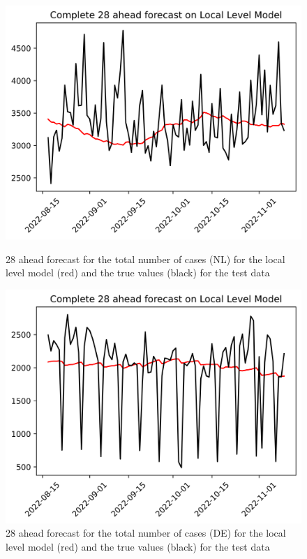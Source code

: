 \begin{figure}

\begin{minipage}{.45\textwidth}
  \centering
  \includegraphics[width=\linewidth]{pics/28_ah/Complete_28_ahead_Local Level Model.png}
  \caption{28 ahead forecast for the total number of cases (NL) for the local level model (red) and the true values (black) for the test data}
  \label{fig:tot_cases_fc_28_LLM}
\end{minipage}
\begin{minipage}{.45\textwidth}
  \centering
  \includegraphics[width=\linewidth]{pics/28_ah/DE_Complete_28_ahead_Local Level Model.png}
  \caption{28 ahead forecast for the total number of cases (DE) for the local level model (red) and the true values (black) for the test data}
  \label{fig:tot_cases_fc_28_LLM_DE}
\end{minipage}

\end{figure}
